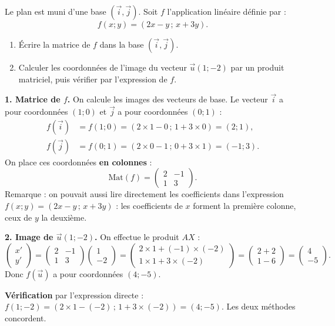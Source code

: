 \documentclass[11pt]{article}
\begin{document}
\begin{exoresolu}
Le plan est muni d'une base $(\vec{i}, \vec{j})$. Soit $f$ l'application linéaire définie par :
\[ f(x ; y) = (2x - y \,;\, x + 3y). \]
\begin{enumerate}
\item Écrire la matrice de $f$ dans la base $(\vec{i}, \vec{j})$.
\item Calculer les coordonnées de l'image du vecteur $\vec{u}(1 ; -2)$ par un produit matriciel, puis vérifier par l'expression de $f$.
\end{enumerate}
\tcblower
\textbf{1. Matrice de $f$.} On calcule les images des vecteurs de base. Le vecteur $\vec{i}$ a pour coordonnées $(1 ; 0)$ et $\vec{j}$ a pour coordonnées $(0 ; 1)$ :
\begin{align*}
f(\vec{i}) &= f(1 ; 0) = (2\times 1 - 0 \,;\, 1 + 3\times 0) = (2 ; 1), \\
f(\vec{j}) &= f(0 ; 1) = (2\times 0 - 1 \,;\, 0 + 3\times 1) = (-1 ; 3).
\end{align*}
On place ces coordonnées \textbf{en colonnes} :
\[ \mathrm{Mat}(f) = \begin{pmatrix} 2 & -1 \\ 1 & 3 \end{pmatrix}. \]
Remarque : on pouvait aussi lire directement les coefficients dans l'expression $f(x;y) = (2x - y \,;\, x + 3y)$ : les coefficients de $x$ forment la première colonne, ceux de $y$ la deuxième.

\textbf{2. Image de $\vec{u}(1 ; -2)$.} On effectue le produit $AX$ :
\[ \begin{pmatrix} x' \\ y' \end{pmatrix} = \begin{pmatrix} 2 & -1 \\ 1 & 3 \end{pmatrix} \begin{pmatrix} 1 \\ -2 \end{pmatrix} = \begin{pmatrix} 2\times 1 + (-1)\times(-2) \\ 1\times 1 + 3\times(-2) \end{pmatrix} = \begin{pmatrix} 2 + 2 \\ 1 - 6 \end{pmatrix} = \begin{pmatrix} 4 \\ -5 \end{pmatrix}. \]
Donc $f(\vec{u})$ a pour coordonnées $(4 ; -5)$.

\textbf{Vérification} par l'expression directe : $f(1 ; -2) = (2\times 1 - (-2) \,;\, 1 + 3\times(-2)) = (4 ; -5)$. Les deux méthodes concordent.
\end{exoresolu}
\end{document}
